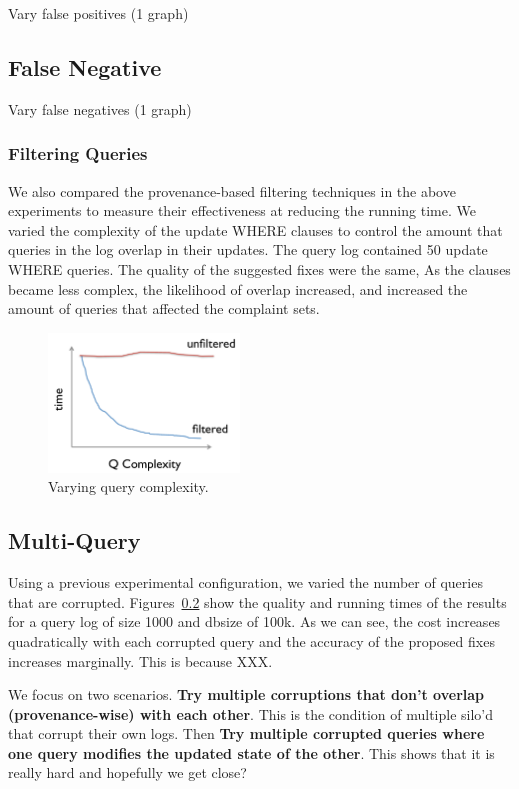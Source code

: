 Vary false positives (1 graph)


\subsection{False Negative}

Vary false negatives (1 graph)

\subsubsection{Filtering Queries}

We also compared the provenance-based filtering techniques in the above experiments
to measure their effectiveness at reducing the running time.  We varied the complexity of the update 
WHERE clauses to control the amount that queries in the log overlap in their updates.  The query log contained 50 update WHERE queries.
The quality of the suggested fixes were the same,  As the clauses became less complex, the likelihood 
of overlap increased, and increased the amount of queries that affected the complaint sets.


\begin{figure}[h]
\centering
\includegraphics[width = 2in]{figures/complete_qfilter_complexity}
\caption{Varying query complexity.}
\label{f:complete_qfilter_complexity} 
\end{figure}



\subsection{Multi-Query}

Using a previous experimental configuration, we varied the number of queries that are corrupted.  Figures~\ref{}
show the quality and running times of the results for a query log of size 1000 and dbsize of 100k.  
As we can see, the cost increases quadratically with each corrupted query and the accuracy of the proposed fixes increases marginally.  
This is because XXX.

We focus on two scenarios.  {\bf Try multiple corruptions that don't overlap (provenance-wise) with each other}.  This is the condition of multiple silo'd that
corrupt their own logs.  Then {\bf Try multiple corrupted queries where one query modifies the updated state of the other}.  This shows that
it is really hard and hopefully we get close?




